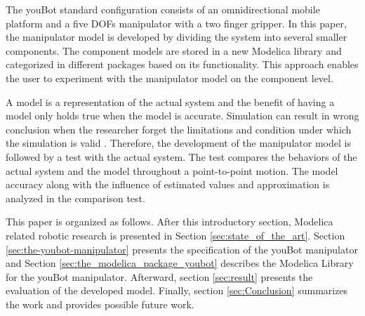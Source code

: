 The youBot standard configuration consists of an omnidirectional mobile platform and a five DOFs manipulator with a two finger gripper.
In this paper, the manipulator model is developed by dividing the system into several smaller components.
The component models are stored in a new Modelica library and categorized in different packages based on its functionality.
This approach enables the user to experiment with the manipulator model on the component level.

A model is a representation of the actual system and the benefit of having a model only holds true when the model is accurate.
Simulation can result in wrong conclusion when the researcher forget the limitations and condition under which the simulation is valid \cite{Fritzson2004}.
Therefore, the development of the manipulator model is followed by a test with the actual system.
The test compares the behaviors of the actual system and the model throughout a point-to-point motion.
The model accuracy along with the influence of estimated values and approximation is analyzed in the comparison test.

This paper is organized as follows. 
After this introductory section, Modelica related robotic research is presented in Section \ref{sec:state_of_the_art}.
Section \ref{sec:the-youbot-manipulator} presents the specification of the youBot manipulator and Section \ref{sec:the_modelica_package_youbot} describes the Modelica Library for the youBot manipulator. 
Afterward, section \ref{sec:result} presents the evaluation of the developed model.
Finally, section \ref{sec:Conclusion} summarizes the work and provides possible future work.